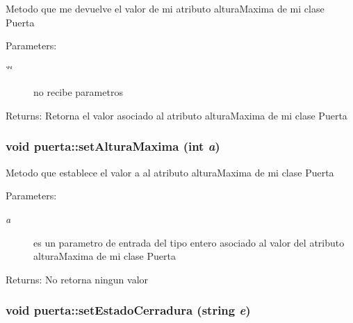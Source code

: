Metodo que me devuelve el valor de mi atributo alturaMaxima de mi clase Puerta \begin{Desc}
\item[Parameters:]
\begin{description}
\item[{\em \char`\"{}\char`\"{}}]no recibe parametros \end{description}
\end{Desc}
\begin{Desc}
\item[Returns:]Retorna el valor asociado al atributo alturaMaxima de mi clase Puerta \end{Desc}
\hypertarget{classpuerta_4dbec0518d2dfbf78e636ea18352cfe1}{
\subsubsection[setAlturaMaxima]{\setlength{\rightskip}{0pt plus 5cm}void puerta::setAlturaMaxima (int {\em a})}}
\label{classpuerta_4dbec0518d2dfbf78e636ea18352cfe1}


Metodo que establece el valor a al atributo alturaMaxima de mi clase Puerta \begin{Desc}
\item[Parameters:]
\begin{description}
\item[{\em a}]es un parametro de entrada del tipo entero asociado al valor del atributo alturaMaxima de mi clase Puerta \end{description}
\end{Desc}
\begin{Desc}
\item[Returns:]No retorna ningun valor \end{Desc}
\hypertarget{classpuerta_c7020654ddeefc2cdfd937fd5d3f6749}{
\subsubsection[setEstadoCerradura]{\setlength{\rightskip}{0pt plus 5cm}void puerta::setEstadoCerradura (string {\em e})}}
\label{classpuerta_c7020654ddeefc2cdfd937fd5d3f6749}


